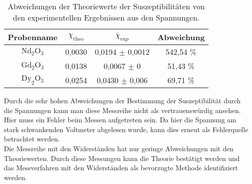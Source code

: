 \begin{table}
    \centering
    \caption{Abweichungen der Theoriewerte der Suszeptibilitäten von den experimentellen Ergebnissen aus den Spannungen.}
    \label{tab:AbwSp}
    \begin{tabular}{c || c | c | c }
      \toprule
      Probenname & $\chi_{\mathrm{theo}}$ & $\overline{\chi}_{\mathrm{exp}}$ & Abweichung \\
      \hline
      $\mathrm{Nd}_2 \mathrm{O}_3$ & 0,0030 & 0,0194 $\pm$ 0,0012   & 542,54 \%\\
      $\mathrm{Gd}_2 \mathrm{O}_3$ & 0,0138 & 0,0067 $\pm$ 0        & 51,43 \%\\
      $\mathrm{Dy}_2 \mathrm{O}_3$ & 0,0254 & 0,0430 $\pm$ 0,006    & 69,71 \%\\
      \midrule
      \bottomrule
    \end{tabular}
\end{table}

Durch die sehr hohen Abweichungen der Bestimmung der Suszeptibilität durch die Spannungen
kann man diese Messreihe nicht als vertrauenswürdig ansehen. Hier muss ein Fehler beim Messen 
aufgetreten sein. Da hier die Spannung am stark schwankenden Voltmeter abgelesen wurde,
kann dies erneut als Fehlerquelle betrachtet werden.\\
Die Messreihe mit den Widerständen hat nur geringe Abweichungen mit den Theoriewerten.
Durch diese Messungen kann die Theorie bestätigt werden und das Messverfahren mit den Widerständen als 
bevorzugte Methode identifiziert werden.